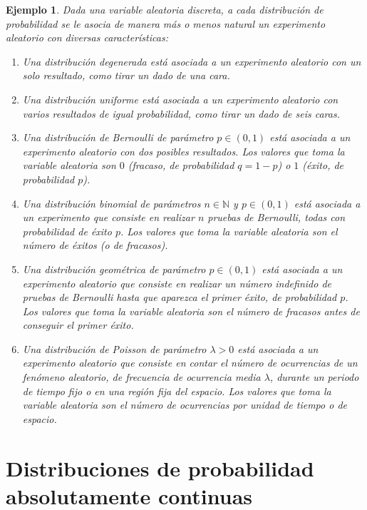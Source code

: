 \documentclass[11pt]{report}
\theoremstyle{mytheorem}
\theoremstyle{mydefinition}
\theoremstyle{myexample}
\newtheorem*{example}{Ejemplo}
\newcommand{\N}{\mathbb N}
\begin{document}
\begin{example} Dada una variable aleatoria discreta, a cada distribución de probabilidad se le asocia de manera más o menos natural un experimento aleatorio con diversas características:
\begin{enumerate}
    \item Una distribución degenerada está asociada a un experimento aleatorio con un solo resultado, como tirar un dado de una cara.
    \item Una distribución uniforme está asociada a un experimento aleatorio con varios resultados de igual probabilidad, como tirar un dado de seis caras.
    \item Una distribución de Bernoulli de parámetro $p \in (0,1)$ está asociada a un experimento aleatorio con dos posibles resultados. Los valores que toma la variable aleatoria son $0$ (\textit{fracaso}, de probabilidad $q = 1-p$) o $1$ (\textit{éxito}, de probabilidad $p$).
    \item Una distribución binomial de parámetros $n \in \N$ y $p \in (0,1)$ está asociada a un experimento que consiste en realizar $n$ pruebas de Bernoulli, todas con probabilidad de éxito $p$. Los valores que toma la variable aleatoria son el número de éxitos (o de fracasos).
    \item Una distribución geométrica de parámetro $p \in (0,1)$ está asociada a un experimento aleatorio que consiste en realizar un número indefinido de pruebas de Bernoulli hasta que aparezca el primer éxito, de probabilidad $p$. Los valores que toma la variable aleatoria son el número de fracasos antes de conseguir el primer éxito.
    \item Una distribución de Poisson de parámetro $\lambda >0$ está asociada a un experimento aleatorio que consiste en contar el número de ocurrencias de un fenómeno aleatorio, de frecuencia de ocurrencia media $\lambda$, durante un periodo de tiempo fijo o en una región fija del espacio. Los valores que toma la variable aleatoria son el número de ocurrencias por unidad de tiempo o de espacio.
\end{enumerate}
\end{example}

\section{Distribuciones de probabilidad absolutamente continuas}
\end{document}
